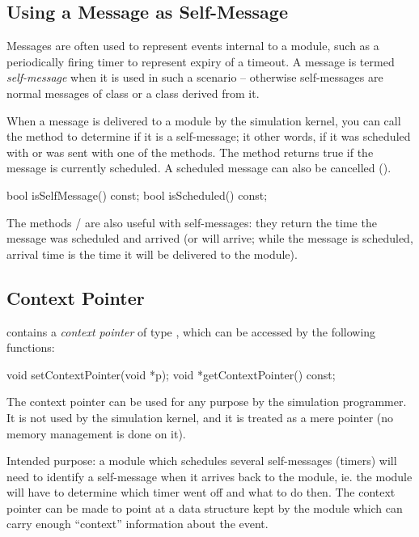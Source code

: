 \subsection{Using a Message as Self-Message}

Messages are often used to represent events internal to a module,
such as a periodically firing timer to represent expiry of a timeout.
A message is termed \textit{self-message} when it is used
in such a scenario -- otherwise self-messages are normal messages
of class  or a class derived from it.

When a message is delivered to a module by the simulation kernel,
you can call the  method to determine if it is
a self-message; it other words, if it was scheduled with
 or was sent with one of the
 methods. The  method
returns true if the message is currently scheduled. A scheduled
message can also be cancelled ().

\begin{cpp}
bool isSelfMessage() const;
bool isScheduled() const;
\end{cpp}

The methods  /  are also
useful with self-messages: they return the time the message was scheduled
and arrived (or will arrive; while the message is scheduled, arrival time
is the time it will be delivered to the module).


\subsection{Context Pointer}

 contains a \textit{context pointer} of type ,
which can be accessed by the following functions:

\begin{cpp}
void setContextPointer(void *p);
void *getContextPointer() const;
\end{cpp}

The context pointer can be used for any purpose by the simulation programmer.
It is not used by the simulation kernel, and it is treated as
a mere pointer (no memory management is done on it).

Intended purpose: a module which schedules several self-messages (timers)
will need to identify a self-message when it arrives back to the module,
ie. the module will have to determine which timer went off and what to do
then. The context pointer can be made to point at a data structure kept by
the module which can carry enough ``context'' information about the event.



